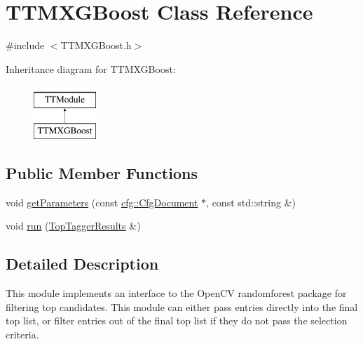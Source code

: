 \hypertarget{classTTMXGBoost}{\section{T\-T\-M\-X\-G\-Boost Class Reference}
\label{classTTMXGBoost}
}


{\ttfamily \#include $<$T\-T\-M\-X\-G\-Boost.\-h$>$}

Inheritance diagram for T\-T\-M\-X\-G\-Boost\-:\begin{figure}[H]
\begin{center}
\leavevmode
\includegraphics[height=2.000000cm]{classTTMXGBoost}
\end{center}
\end{figure}
\subsection*{Public Member Functions}
\begin{DoxyCompactItemize}
\item 
void \hyperlink{classTTMXGBoost_a852aba8afb6f453187871e232927e622}{get\-Parameters} (const \hyperlink{classcfg_1_1CfgDocument}{cfg\-::\-Cfg\-Document} $\ast$, const std\-::string \&)
\item 
void \hyperlink{classTTMXGBoost_afd522be937c0e1c8226c83cc6888c666}{run} (\hyperlink{classTopTaggerResults}{Top\-Tagger\-Results} \&)
\end{DoxyCompactItemize}


\subsection{Detailed Description}
This module implements an interface to the Open\-C\-V randomforest package for filtering top candidates. This module can either pass entries directly into the final top list, or filter entries out of the final top list if they do not pass the selection criteria.


